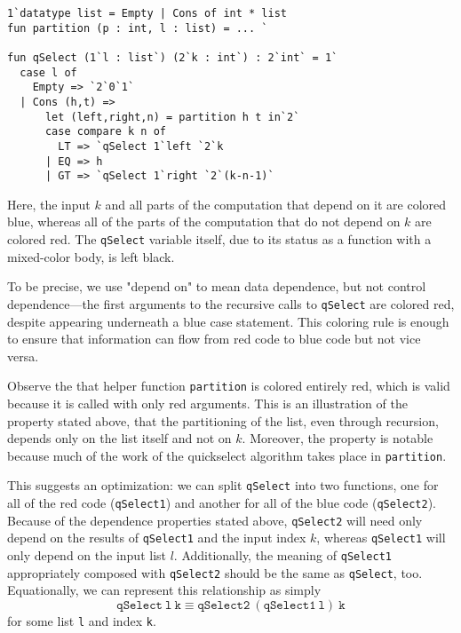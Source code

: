 \begin{lstlisting} 
1`datatype list = Empty | Cons of int * list
fun partition (p : int, l : list) = ... `

fun qSelect (1`l : list`) (2`k : int`) : 2`int` = 1`
  case l of
    Empty => `2`0`1`
  | Cons (h,t) => 
      let (left,right,n) = partition h t in`2`
      case compare k n of
        LT => `qSelect 1`left `2`k
      | EQ => h
      | GT => `qSelect 1`right `2`(k-n-1)`
\end{lstlisting}

Here, the input $k$ and all parts of the computation that depend on it are colored blue,
whereas all of the parts of the computation that do not depend on $k$ are colored red.
The \texttt{qSelect} variable itself, due to its status as a function with a mixed-color body, is left black.


To be precise, we use "depend on" to mean data dependence, but not control dependence---the 
first arguments to the recursive calls to \texttt{qSelect} are colored red,
despite appearing underneath a blue case statement.
This coloring rule is enough to ensure that information can flow from red code to blue code but not vice versa.

Observe the that helper function \texttt{partition} is colored entirely red,
which is valid because it is called with only red arguments.  
This is an illustration of the property stated above, that 
the partitioning of the list, even through recursion, depends only on the list itself and not on $k$.
Moreover, the property is notable because much of the work of the quickselect algorithm takes place in \texttt{partition}.

This suggests an optimization: we can split \texttt{qSelect} into two functions, 
one for all of the red code (\texttt{qSelect1}) and another for all of the blue code (\texttt{qSelect2}). 
Because of the dependence properties stated above, 
\texttt{qSelect2} will need only depend on the results of \texttt{qSelect1} and the input index $k$,
whereas \texttt{qSelect1} will only depend on the input list $l$.
Additionally, the meaning of \texttt{qSelect1} appropriately composed with \texttt{qSelect2} should be the same as \texttt{qSelect}, too.
Equationally, we can represent this relationship as simply 
\[
\mathtt{qSelect~l~k} \equiv \mathtt{qSelect2~(qSelect1~l)~k}
\]
for some list \texttt{l} and index \texttt{k}.


